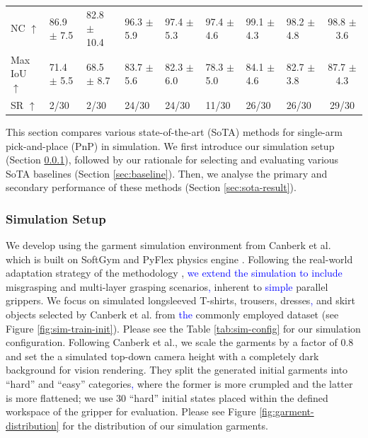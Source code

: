 \documentclass[journal]{IEEEtran}
\newcommand{\addadvantage}[1]{\textcolor{blue}{#1}}
\newcommand{\addIncrementalg}[1]{\textcolor{mygreen}{#1}}
\begin{document}
\begin{table}[t!]
{\begin{tabular}{p{1.8cm}|p{1.6cm}p{1.7cm}p{1.9cm}p{1.9cm}|p{2.1cm}p{1.9cm}p{2.2cm}||c}
NC $\uparrow$ & 86.9 $\pm$ 7.5 & 82.8 $\pm$ 10.4 & 96.3 $\pm$ 5.9 & 97.4 $\pm$ 5.3 & 97.4 $\pm$ 4.6 & \cellcolor{green!25}99.1 $\pm$ 4.3 & \cellcolor{red!25}98.2 $\pm$ 4.8 & \cellcolor{yellow!25}98.8 $\pm$ 3.6 \\
Max IoU $\uparrow$ & 71.4 $\pm$ 5.5 & 68.5 $\pm$ 8.7 & \cellcolor{red!25}83.7 $\pm$ 5.6 & 82.3 $\pm$ 6.0 & 78.3 $\pm$ 5.0 & \cellcolor{yellow!25}84.1 $\pm$ 4.6 & 82.7 $\pm$ 3.8 & \cellcolor{green!25}87.7 $\pm$ 4.3 \\
SR $\uparrow$ & 2/30 & 2/30 & \cellcolor{red!25}24/30 & \cellcolor{red!25}24/30 & 11/30 & \cellcolor{yellow!25}26/30 & \cellcolor{yellow!25}26/30 & \cellcolor{green!25}29/30 \\
\bottomrule
\end{tabular}}

\end{table}



\addIncrementalg{This section compares various state-of-the-art (SoTA) methods for single-arm pick-and-place (PnP) in simulation. We first introduce our simulation setup (Section \ref{sec:simulation}), followed by our rationale for selecting and evaluating various SoTA baselines (Section \ref{sec:baseline}). Then, we analyse the primary and secondary performance of these methods (Section \ref{sec:sota-result}).}

\subsubsection{Simulation Setup} \label{sec:simulation}

We develop  using the garment simulation environment from Canberk et al.~\cite{canberk2023cloth} which is built on SoftGym \cite{lin2020softgym} and PyFlex physics engine \cite{li2018learning}. Following the real-world adaptation strategy of the  methodology \cite{kadi2025draper}, \addadvantage{we extend the simulation to include} misgrasping and multi-layer grasping scenarios\addadvantage{,} inherent to \addadvantage{simple} parallel grippers. We focus on simulated longsleeved T-shirts, trousers, dresses\addadvantage{,} and skirt objects selected by Canberk et al. from \addadvantage{the} commonly employed  dataset \cite{bertiche2020cloth3d} (see Figure \ref{fig:sim-train-init}). Please see the Table \ref{tab:sim-config} for our simulation configuration. Following Canberk et al., we scale the garments by a factor of 0.8 and set the a simulated top-down camera height with a completely dark background for vision rendering. They split the generated initial garments into ``hard'' and ``easy'' categories\addadvantage{,} where the former is more crumpled and the latter is more flattened; we use 30 ``hard'' initial states placed within the defined workspace of the gripper for evaluation. Please see Figure \ref{fig:garment-distribution} for the distribution of our simulation garments.
\end{document}

